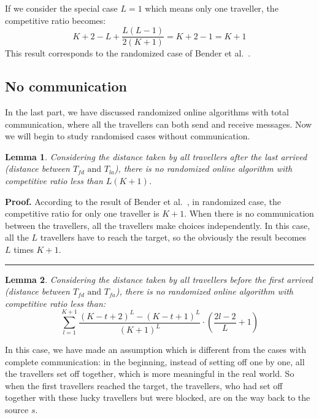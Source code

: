 \documentclass[letter-size, 11pt]{article}
\newtheorem{lemma}{Lemma}
\newenvironment{proof}[1][Proof]{\textbf{#1.} }{\ \rule{0.5em}{0.5em}}
\begin{document}
If we consider the special case $L=1$ which means only one traveller, the competitive ratio becomes:
\[
K+2-L+ \frac{L(L-1)}{2(K+1)} = K+2-1 = K+1
\]
This result corresponds to the randomized case of Bender et al.~\cite{BeWe15}.

\subsection{No communication}

In the last part, we have discussed randomized online algorithms with total communication, where all the travellers can both send and receive messages. Now we will begin to study randomised cases without communication. 

\begin{lemma}
Considering the distance taken by all travellers after the last arrived (distance between $T_{fd} \mbox{\ and } T_{la}$), there is no randomized online algorithm with competitive ratio less than $ L(K+1)$.
\end{lemma}

\begin{proof} 
According to the result of Bender et al.~\cite{BeWe15}, in randomized case, the competitive ratio for only one traveller is $K+1$. When there is no communication between the travellers, all the travellers make choices independently. In this case, all the $L$ travellers have to reach the target, so the obviously the result becomes $L$ times $K+1$.
\end{proof}

\begin{lemma}
Considering the distance taken by all travellers before the first arrived (distance between $T_{fd} \mbox{\ and } T_{fa}$), there is no randomized online algorithm with competitive ratio less than:
\begin{equation}
\sum_{l=1}^{K+1}\frac{(K-t+2)^{L} - (K-t+1)^{L}}{(K+1)^{L}}\cdot (\frac{2l-2}{L}+1)
\label{cr_rand}
\end{equation}
\end{lemma}

In this case, we have made an assumption which is different from the cases with complete communication: in the beginning, instead of setting off one by one, all the travellers set off together, which is more meaningful in the real world. So when the first travellers reached the target, the travellers, who had set off together with these lucky travellers but were blocked, are on the way back to the source $s$.
\end{document}
